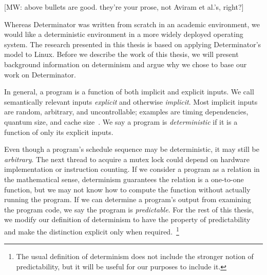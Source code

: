 [MW: above bullets are good. they're your prose, not Aviram et al.'s,
right?]

\fi

\iffalse
# The state of parallel programming and nondeterminism
* As processes move from single to multiple cores, more and more applications
  are written parallel.
* Today, the dominant parallel programming model is nondeterministic. In this
  model:
* Threads share address space, file system, and other globally visible
  resources and
* The OS is free to schedule threads arbitrarily and lock abstractions are not
  deterministic or predictable.
* This model is popular despite drawbacks:
* Data races and lock abstractions introduce bugs and deadlock,
* Programmers spend a lot of time eliminating nondeterminism (data races) using
  unpredictable synchronization primitives,
* Programmers must worry about hardware side effects like ordering of committing
  memory operations,
* Debugging and quality assurance are difficult without repeatability.
\fi

Whereas Determinator was written from scratch in an academic environment,
we would like a deterministic environment in a more widely deployed operating
system. The research presented in this thesis is based on applying
Determinator's model to Linux. Before we describe the work of this thesis, we
will present background information on determinism and argue why we chose to
base our work on Determinator.

In general, a program is a function of both implicit and explicit inputs.
We call semantically relevant inputs \emph{explicit} and otherwise
\emph{implicit}. Most implicit inputs are
random, arbitrary, and uncontrollable; examples are timing dependencies, quantum
size, and cache size~\cite{Bergan10}. We say a program is \emph{deterministic}
if it is a function of only its explicit inputs.

Even though a program's schedule
sequence may be deterministic, it may still be \emph{arbitrary}. The next
thread to acquire a mutex lock could depend on hardware implementation or
instruction counting. If we consider a program as a relation in the
mathematical sense, determinism guarantees the relation is a one-to-one
function, but we may not know how to compute the function without actually
running the program. If we can determine a program's output from examining the
program code, we say the program is \emph{predictable}. For the rest of this
thesis, we modify our definition of determinism to have the property of
predictability and make the distinction explicit only when
required.~\footnote{The usual definition of determinism does not include the
stronger notion of predictability, but it will be useful for our purposes to
include it.}

